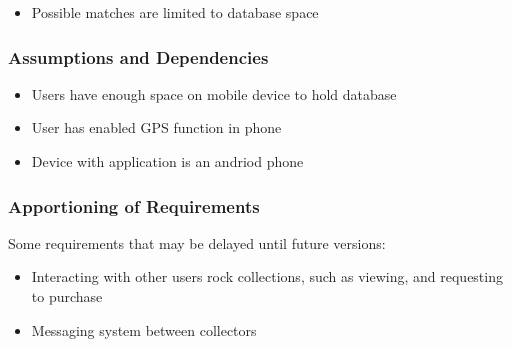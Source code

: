 \documentclass[titlepage]{article}
\begin{document}
\begin{itemize}
\item Possible matches are limited to database space\\
\end{itemize}


\subsubsection{Assumptions and Dependencies}

\begin{itemize}
\item Users have enough space on mobile device to hold database\\
\item User has enabled GPS function in phone\\
\item Device with application is an andriod phone\\
\end{itemize}


\subsubsection{Apportioning of Requirements}

Some requirements that may be delayed until future versions:

\begin{itemize}
\item Interacting with other users rock collections, such as viewing, and requesting to purchase \\
\item Messaging system between collectors \\
\end{itemize}
\end{document}

